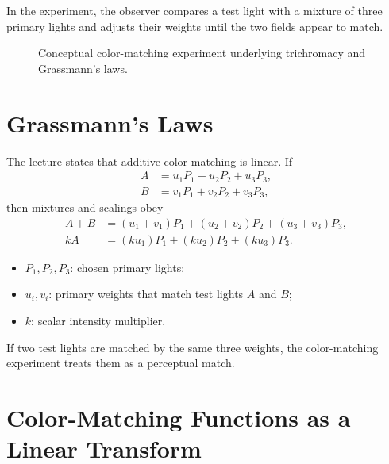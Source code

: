 \documentclass[11pt,a4paper,oneside]{report}
\newcommand{\mathlegend}[1]{%
  \par\vspace{0.2em}{\small\itshape where}\par
  \begin{itemize}[leftmargin=1.7em,topsep=0.15em,itemsep=0.12em]
  #1
  \end{itemize}
}
\begin{document}
In the experiment, the observer compares a test light with a mixture of three primary lights and adjusts their weights until the two fields appear to match.
\begin{figure}[!htbp]
\centering
{}
\caption{Conceptual color-matching experiment underlying trichromacy and Grassmann's laws.}
\label{fig:color-matching-experiment}
\end{figure}

\section{Grassmann's Laws}

The lecture states that additive color matching is linear. If
\begin{align*}
A &= u_1P_1+u_2P_2+u_3P_3,\\
B &= v_1P_1+v_2P_2+v_3P_3,
\end{align*}
then mixtures and scalings obey
\begin{align}
A+B &= (u_1+v_1)P_1+(u_2+v_2)P_2+(u_3+v_3)P_3,\label{eq:grassmann-add}\\
kA &= (ku_1)P_1+(ku_2)P_2+(ku_3)P_3.\label{eq:grassmann-scale}
\end{align}
\mathlegend{
  \item $P_1,P_2,P_3$: chosen primary lights;
  \item $u_i,v_i$: primary weights that match test lights $A$ and $B$;
  \item $k$: scalar intensity multiplier.
}
If two test lights are matched by the same three weights, the color-matching experiment treats them as a perceptual match.

\section{Color-Matching Functions as a Linear Transform}
\end{document}
